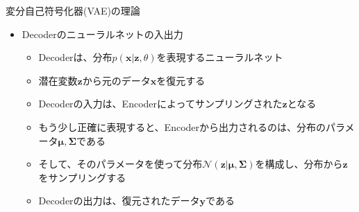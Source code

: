 \documentclass[dvipdfmx,notheorems,t]{beamer}
\begin{document}
\begin{frame}{変分自己符号化器(VAE)の理論}

\begin{itemize}
	\item Decoderのニューラルネットの入出力
	\begin{itemize}
		\item Decoderは、分布$p(\bm{x} | \bm{z}, \theta)$を表現するニューラルネット
		\item 潜在変数$\bm{z}$から元のデータ$\bm{x}$を復元する
		\newline
	
		\item Decoderの入力は、Encoderによってサンプリングされた$\bm{z}$となる
		\newline
		\item もう少し正確に表現すると、Encoderから出力されるのは、分布のパラメータ$\bm{\mu}, \bm{\Sigma}$である
		\item そして、そのパラメータを使って分布$\mathcal{N}(\bm{z} | \bm{\mu}, \bm{\Sigma})$を構成し、分布から$\bm{z}$をサンプリングする
		\newline
		
		\item Decoderの出力は、復元されたデータ$\bm{y}$である
	\end{itemize}
\end{itemize}

\end{frame}
\end{document}
